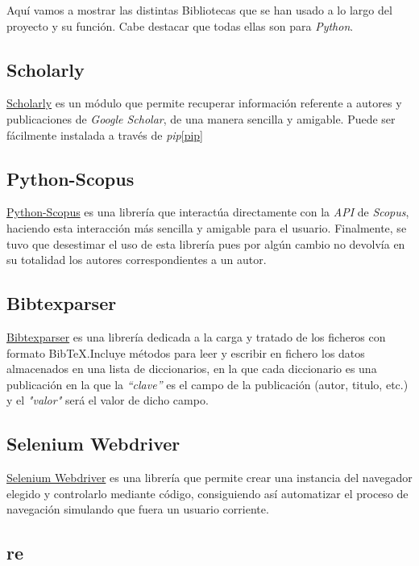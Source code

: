 Aquí vamos a mostrar las distintas Bibliotecas que se han usado a lo largo del proyecto y su función. Cabe destacar que todas ellas son para \emph{Python}.
\subsection{Scholarly}

\href{https://github.com/OrganicIrradiation/scholarly}{Scholarly}\cite{scholarly} es un módulo que permite recuperar información referente a autores y publicaciones de \emph{Google Scholar}, de una manera sencilla y amigable. Puede ser fácilmente instalada a través de \emph{pip}\ref{pip}
\subsection{Python-Scopus}

\href {https://github.com/zhiyzuo/python-scopus}{Python-Scopus} es una librería que interactúa directamente con la \emph{API} de \emph {Scopus}, haciendo esta interacción más sencilla y amigable para el usuario.
	Finalmente, se tuvo que desestimar el uso de esta librería pues por algún cambio no devolvía en su totalidad los autores correspondientes a un autor\cite{pyscopus}.

\subsection{Bibtexparser}

\href{https://bibtexparser.readthedocs.io/en/master/} {Bibtexparser} es una librería dedicada a la carga y tratado de los ficheros con formato BibTeX.Incluye métodos para leer y escribir en fichero los datos almacenados en una lista de diccionarios, en la que cada diccionario es una publicación en la que la \emph{``clave''} es el campo de la publicación (autor, titulo, etc.) y el \emph{"valor"} será el valor de dicho campo\cite{bibtexparser}.
\subsection{Selenium Webdriver}
\href {https://www.seleniumhq.org/projects/webdriver/}{Selenium Webdriver} es una librería que permite crear una instancia del navegador elegido y controlarlo mediante código, consiguiendo así automatizar el proceso de navegación simulando que fuera un usuario corriente\cite{selenium}.
\subsection{re}

